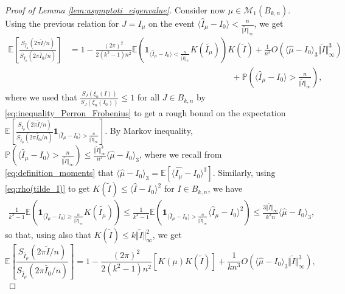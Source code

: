 \documentclass[10pt,11pt]{amsart}%
\begin{document}
\begin{proof}[Proof of Lemma \ref{lem:asymptoti_eigenvalue}]
Consider now $\mu\in\mathcal{M}_1(B_{k,n})$. Using the previous relation for $J=I_{\mu}$ on the event $\langle  \hat{I}_{\mu}-I_0\rangle<\frac{n}{\Vert \tilde{I}\Vert_{\infty}}$, we get 
\begin{align*}
\mathbb{E}\left[\frac{S_{\hat{I}_{\mu}}(2\pi \tilde{I}/n)}{S_{\hat{I}_{\mu}}(2\pi\tilde{I_0}/n)}\right]&= 1-\frac{(2\pi)^2}{2(k^2-1)n^2}\mathbb{E}\left(\mathbf{1}_{\langle  \hat{I}_{\mu}-I_0\rangle<\frac{n}{\Vert \tilde{I}\Vert_{\infty}}}K\left(\widetilde{I_{\mu}}\right)\right)K\left(\widetilde{I}\right)+\frac{1}{n^3}O\left(\langle\hat{\mu}-I_0\rangle_3\Vert \tilde{I}\Vert_\infty^3\right)\\
&\hspace{8cm}+\mathbb{P}\left(\langle  \hat{I}_{\mu}-I_0\rangle>\frac{n}{\Vert \tilde{I}\Vert_{\infty}}\right),
\end{align*}
where we used that $\frac{S_{J}(\xi_{n}(I))}{S_{J}(\xi_{n}(I_0))}\leq 1$ for all $J\in B_{k,n}$ by \eqref{eq:inequality_Perron_Frobenius} to get a rough bound on the expectation $\mathbb{E}\left[\frac{S_{\hat{I}_{\mu}}(2\pi \tilde{I}/n)}{S_{\hat{I}_{\mu}}(2\pi\tilde{I_0}/n)}\mathbf{1}_{\langle  \hat{I}_{\mu}-I_0\rangle>\frac{n}{\Vert \tilde{I}\Vert_{\infty}}}\right]$. By Markov inequality, $\mathbb{P}\left(\langle  \hat{I}_{\mu}-I_0\rangle>\frac{n}{\Vert \tilde{I}\Vert_{\infty}}\right)\leq \frac{\Vert \tilde{I}\Vert_\infty^3}{n^3}\langle\hat{\mu}-I_0\rangle_3$, where we recall from \eqref{eq:definition_moments} that $\langle\hat{\mu}-I_0\rangle_3=\mathbb{E}\left[\langle \widehat{I_{\mu}}-I_0\rangle^3\right]$. Similarly, using \eqref{eq:rho(tilde_I)} to get $K(\tilde{I})\leq \langle \hat{I}-I_0\rangle^2$ for $I\in B_{k,n}$, we have
\begin{align*}
\frac{1}{k^2-1}\mathbb{E}\left(\mathbf{1}_{\langle  \hat{I}_{\mu}-I_0\rangle\geq\frac{n}{\Vert \tilde{I}\Vert_{\infty}}}K\left(\widetilde{I_{\mu}}\right)\right)\leq \frac{1}{k^2-1} \mathbb{E}\left(\mathbf{1}_{\langle  \hat{I}_{\mu}-I_0\rangle>\frac{n}{\Vert \tilde{I}\Vert_{\infty}}}\langle  \hat{I}_{\mu}-I_0\rangle^2\right)\leq  \frac{3\Vert \tilde{I}\Vert_{\infty}}{k^2n}\langle\hat{\mu}-I_0\rangle_3,
\end{align*}
so that, using also that $K(\tilde{I})\leq k\Vert \tilde{I}\Vert_{\infty}^2$, we get 
\begin{equation}\label{eq:asymptotic_eigenvalue_SUk}
\mathbb{E}\left[\frac{S_{\hat{I}_{\mu}}(2\pi \tilde{I}/n)}{S_{\hat{I}_{\mu}}(2\pi\tilde{I_0}/n)}\right]=1-\frac{(2\pi)^2}{2(k^2-1)n^2}\left[K(\mu)K(\tilde{I})\right]+\frac{1}{kn^3}O\left(\langle\hat{\mu}-I_0\rangle_3\Vert \tilde{I}\Vert_\infty^3\right),

\end{equation}
\end{proof}
\end{document}
